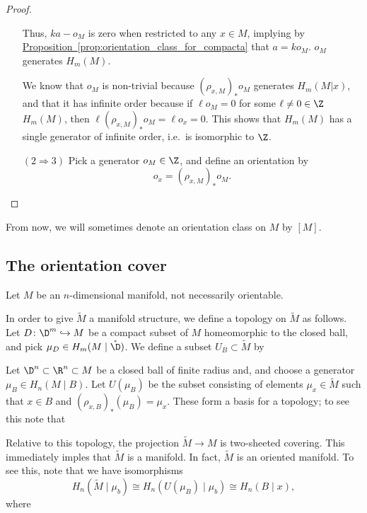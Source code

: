 \documentclass[main.tex]{subfiles}
\begin{document}
\begin{proof}
\begin{enumerate}[leftmargin=4em]
      Thus, \(ka - o_{M}\) is zero when restricted to any \(x \in M\), implying by \hyperref[prop:orientation_class_for_compacta]{Proposition~\ref*{prop:orientation_class_for_compacta}} that \(a = k o_{M}\). \(o_{M}\) generates \(H_{m}(M)\).

      We know that \(o_{M}\) is non-trivial because \((\rho_{x, M})_{*} o_{M}\) generates \(H_{m}(M | x)\), and that it has infinite order because if \(\ell o_{M} = 0\) for some \(\ell \neq 0 \in \Z\) \(H_{m}(M)\), then \(\ell (\rho_{x, M})_{*}o_{M} = \ell o_{x} = 0\). This shows that \(H_{m}(M)\) has a single generator of infinite order, i.e.\ is isomorphic to \(\Z\).


    \item[\((2 \Rightarrow 3)\)] Pick a generator \(o_{M} \in \Z\), and define an orientation by
      \begin{equation*}
        o_{x} = (\rho_{x, M})_{*} o_{M}.
      \end{equation*}
  \end{enumerate}
\end{proof}

From now, we will sometimes denote an orientation class on \(M\) by \([M]\).

\subsection{The orientation cover}
\label{ssc:the_orientation_cover}

Let \(M\) be an \(n\)-dimensional manifold, not necessarily orientable.

In order to give \(\tilde{M}\) a manifold structure, we define a topology on \(\tilde{M}\) as follows. Let \(D\colon \D^{m} \hookrightarrow M\) be a compact subset of \(M\) homeomorphic to the closed ball, and pick \(\mu_{D} \in H_{m}(M \mid \mathring{\D})\). We define a subset \(U_{B} \subset \tilde{M}\) by

Let \(\D^{n} \subset \R^{n} \subset M\) be a closed ball of finite radius and, and choose a generator \(\mu_{B} \in H_{n}(M \mid B)\). Let \(U(\mu_{B})\) be the subset consisting of elements \(\mu_{x} \in \tilde{M}\) such that \(x \in B\) and \((\rho_{x,B})_{*}(\mu_{B}) = \mu_{x}\). These form a basis for a topology; to see this note that

Relative to this topology, the projection \(\tilde{M} \to M\) is two-sheeted covering. This immediately imples that \(\tilde{M}\) is a manifold. In fact, \(\tilde{M}\) is an oriented manifold. To see this, note that we have isomorphisms
\begin{equation*}
  H_{n}(\tilde{M} \mid \mu_{b}) \cong H_{n}(U(\mu_{B}) \mid \mu_{b}) \cong H_{n}(B \mid x),
\end{equation*}
where
\end{document}
